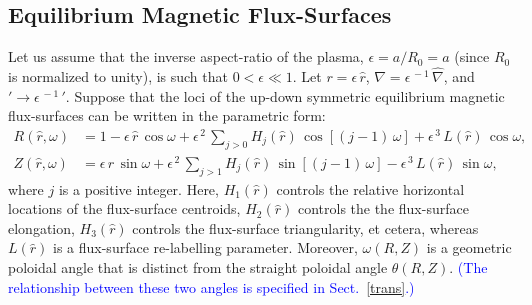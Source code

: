 \documentclass[12pt,prb,aps]{revtex4-1}
\begin{document}
\subsection{Equilibrium Magnetic Flux-Surfaces}\label{flux}
Let us assume that the inverse aspect-ratio of the plasma, $\epsilon=a/R_0=a$ (since $R_0$ is normalized to unity), is such that $0<\epsilon\ll 1$.  
Let $r=\epsilon\,\hat{r}$, $\nabla =\epsilon^{\,-1}\,\hat{\nabla}$, and $'\rightarrow \epsilon^{\,-1}\,'$. 
Suppose that the loci of the up-down symmetric equilibrium magnetic flux-surfaces can be written in the parametric form:\,\cite{tj,tj1,connor}
\begin{align}
R(\hat{r},\omega) &= 1 -\epsilon\,\hat{r}\,\cos\omega + \epsilon^{\,2}\,\sum_{j>0}H_j(\hat{r})\,\cos[(j-1)\,\omega] +\epsilon^{\,3}\,L(\hat{r})\,\cos\omega,\label{e19x}\\[0.5ex]
Z(\hat{r},\omega)&= \epsilon\,\hat{r}\,\sin\omega +\epsilon^{\,2}\,\sum_{j>1}H_j(\hat{r})\,\sin[(j-1)\,\omega]-\epsilon^{\,3}\,L(\hat{r})\,\sin\omega,\label{e20x}
\end{align}
where $j$ is a positive integer. 
Here, $H_1(\hat{r})$  controls the relative horizontal locations of the flux-surface centroids, $H_2(\hat{r})$ controls the 
the flux-surface elongation, $H_3(\hat{r})$  controls the flux-surface triangularity, et cetera, whereas $L(\hat{r})$ is a
flux-surface re-labelling parameter. Moreover, $\omega(R,Z)$ is a  geometric poloidal angle that is distinct from the straight poloidal angle $\theta(R,Z)$.
\textcolor{blue}{(The relationship between these two angles is specified in Sect.~\ref{trans}.)}
\end{document}
